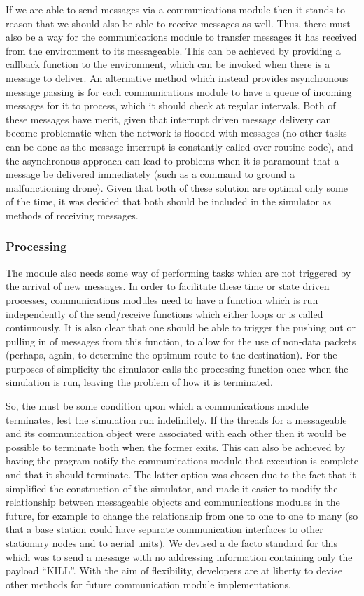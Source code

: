 If we are able to send messages via a communications module then it stands to reason that we should also be able to receive messages as well. Thus, there must also be a way for the communications module to transfer messages it has received from the environment to its messageable. This can be achieved by providing a callback function to the environment, which can be invoked when there is a message to deliver. An alternative method which instead provides asynchronous message passing is for each communications module to have a queue of incoming messages for it to process, which it should check at regular intervals. Both of these messages have merit, given that interrupt driven message delivery can become problematic when the network is flooded with messages (no other tasks can be done as the message interrupt is constantly called over routine code), and the asynchronous approach can lead to problems when it is paramount that a message be delivered immediately (such as a command to ground a malfunctioning drone). Given that both of these solution are optimal only some of the time, it was decided that both should be included in the simulator as methods of receiving messages.

\subsubsection{Processing}
The module also needs some way of performing tasks which are not triggered by the arrival of new messages. In order to facilitate these time or state driven processes, communications modules need to have a function which is run independently of the send/receive functions which either loops or is called continuously. It is also clear that one should be able to trigger the pushing out or pulling in of messages from this function, to allow for the use of non-data packets (perhaps, again, to determine the optimum route to the destination). For the purposes of simplicity the simulator calls the processing function once when the simulation is run, leaving the problem of how it is terminated.

So, the must be some condition upon which a communications module terminates, lest the simulation run indefinitely. If the threads for a messageable and its communication object were associated with each other then it would be possible to terminate both when the former exits. This can also be achieved by having the program notify the communications module that execution is complete and that it should terminate. The latter option was chosen due to the fact that it simplified the construction of the simulator, and made it easier to modify the relationship between messageable objects and communications modules in the future, for example to change the relationship from one to one to one to many (so that a base station could have separate communication interfaces to other stationary nodes and to aerial units). We devised a de facto standard for this which was to send a message with no addressing information containing only the payload ``KILL''. With the aim of flexibility, developers are at liberty to devise other methods for future communication module implementations.

